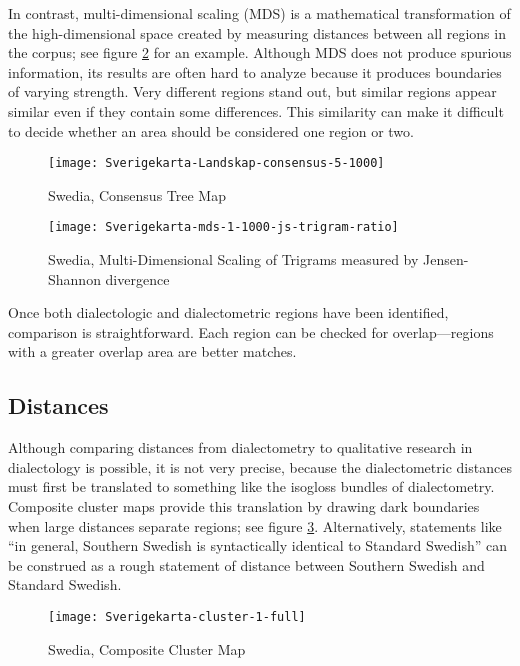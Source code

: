 In contrast, multi-dimensional scaling (MDS) is a mathematical
transformation of the high-dimensional space created by measuring
distances between all regions in the corpus; see figure
\ref{mds-example-small} for an example. Although MDS does not produce
spurious information, its results are often hard to analyze because it
produces boundaries of varying strength. Very different regions stand
out, but similar regions appear similar even if they contain some
differences. This similarity can make it difficult to decide whether
an area should be considered one region or two.

\begin{figure}
  \texttt{[image: Sverigekarta-Landskap-consensus-5-1000]}
 \caption{Swedia, Consensus Tree Map}
  \label{consensus-example-small}
\end{figure}

\begin{figure}
  \texttt{[image: Sverigekarta-mds-1-1000-js-trigram-ratio]}
 \caption{Swedia, Multi-Dimensional Scaling of Trigrams measured by
    Jensen-Shannon divergence}
  \label{mds-example-small}
\end{figure}

Once both dialectologic and dialectometric regions have been
identified, comparison is straightforward. Each region can be checked
for overlap---regions with a greater overlap area are better matches.

\subsection{Distances}

Although comparing distances from dialectometry to qualitative
research in dialectology is possible, it is not very precise, because
the dialectometric distances must first be translated to something
like the isogloss bundles of dialectometry. Composite cluster maps
provide this translation by drawing dark boundaries when large
distances separate regions; see figure
\ref{composite-example-small}. Alternatively, statements like ``in
general, Southern Swedish is syntactically identical to Standard
Swedish'' \cite{rosenkvist07} can be construed as a rough statement of
distance between Southern Swedish and Standard Swedish.

\begin{figure}
  \texttt{[image: Sverigekarta-cluster-1-full]}
 \caption{Swedia, Composite Cluster Map}
  \label{composite-example-small}
\end{figure}


